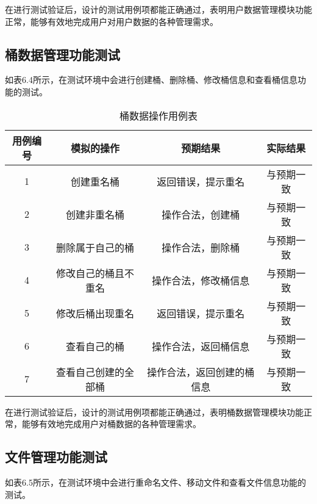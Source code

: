 在进行测试验证后，设计的测试用例项都能正确通过，表明用户数据管理模块功能正常，能够有效地完成用户对用户数据的各种管理需求。

\subsection{桶数据管理功能测试}

如表6.4所示，在测试环境中会进行创建桶、删除桶、修改桶信息和查看桶信息功能的测试。

\begin{table}[h]
  \centering
  \vspace{10pt}
  \caption{桶数据操作用例表}
  \vspace{-15pt}
  \begin{tabular}{cccc}
    \toprule
    用例编号 & 模拟的操作   & 预期结果  & 实际结果 \\
    \midrule
    1 & 创建重名桶           & 返回错误，提示重名         & 与预期一致\\
    2 & 创建非重名桶          & 操作合法，创建桶          & 与预期一致\\
    3 & 删除属于自己的桶      & 操作合法，删除桶           & 与预期一致\\
    4 & 修改自己的桶且不重名   & 操作合法，修改桶信息       & 与预期一致\\
    5 & 修改后桶出现重名      & 返回错误，提示重名         & 与预期一致\\
    6 & 查看自己的桶          & 操作合法，返回桶信息       & 与预期一致\\
    7 & 查看自己创建的全部桶   & 操作合法，返回创建的桶信息  & 与预期一致\\
    \bottomrule
  \end{tabular}
\end{table}

在进行测试验证后，设计的测试用例项都能正确通过，表明桶数据管理模块功能正常，能够有效地完成用户对桶数据的各种管理需求。

\subsection{文件管理功能测试}

如表6.5所示，在测试环境中会进行重命名文件、移动文件和查看文件信息功能的测试。

